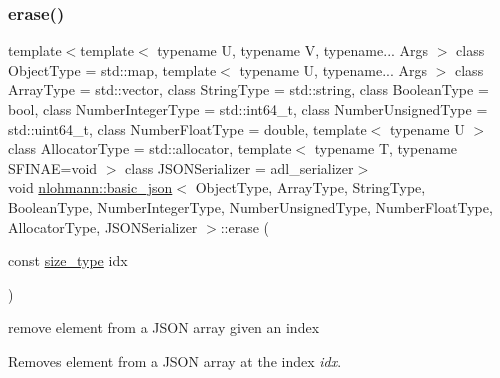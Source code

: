 \mbox{\label{classnlohmann_1_1basic__json_a88cbcefe9a3f4d294bed0653550a5cb9}} 
\subsubsection{\texorpdfstring{erase()}{erase()}\hspace{0.1cm}{\footnotesize\ttfamily [4/4]}}
{\footnotesize\ttfamily template$<$template$<$ typename U, typename V, typename... Args $>$ class Object\+Type = std\+::map, template$<$ typename U, typename... Args $>$ class Array\+Type = std\+::vector, class String\+Type  = std\+::string, class Boolean\+Type  = bool, class Number\+Integer\+Type  = std\+::int64\+\_\+t, class Number\+Unsigned\+Type  = std\+::uint64\+\_\+t, class Number\+Float\+Type  = double, template$<$ typename U $>$ class Allocator\+Type = std\+::allocator, template$<$ typename T, typename S\+F\+I\+N\+A\+E=void $>$ class J\+S\+O\+N\+Serializer = adl\+\_\+serializer$>$ \\
void \mbox{\hyperlink{classnlohmann_1_1basic__json}{nlohmann\+::basic\+\_\+json}}$<$ Object\+Type, Array\+Type, String\+Type, Boolean\+Type, Number\+Integer\+Type, Number\+Unsigned\+Type, Number\+Float\+Type, Allocator\+Type, J\+S\+O\+N\+Serializer $>$\+::erase (\begin{DoxyParamCaption}\item[{const \mbox{\hyperlink{classnlohmann_1_1basic__json_a39f2cd0b58106097e0e67bf185cc519b}{size\+\_\+type}}}]{idx }\end{DoxyParamCaption})\hspace{0.3cm}{\ttfamily [inline]}}



remove element from a J\+S\+ON array given an index 

Removes element from a J\+S\+ON array at the index {\itshape idx}.


